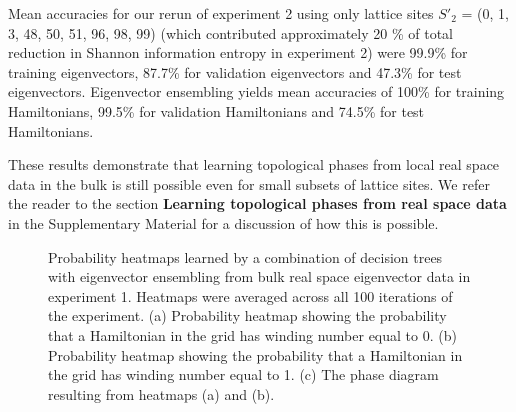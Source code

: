 \documentclass[10pt]{revtex4-1}
\begin{document}
Mean accuracies for our rerun of experiment 2 using only lattice sites $S'_2$ = (0, 1, 3, 48, 50, 51, 96, 98, 99) (which contributed approximately 20 \% of total reduction in Shannon information entropy in experiment 2) were 99.9\% for training eigenvectors, 87.7\% for validation eigenvectors and 47.3\% for test eigenvectors. Eigenvector ensembling yields mean accuracies of 100\% for training Hamiltonians, 99.5\% for validation Hamiltonians and 74.5\% for test Hamiltonians.  

These results demonstrate that learning topological phases from local real space data in the bulk is still possible even for small subsets of lattice sites. We refer the reader to the section \textbf{Learning topological phases from real space data} in the Supplementary Material for a discussion of how this is possible.

\begin{figure}
\centering
{}
\caption{Probability heatmaps learned by a combination of decision trees with eigenvector ensembling from bulk real space eigenvector data in experiment 1. Heatmaps were averaged across all 100 iterations of the experiment. (a) Probability heatmap showing the probability that a Hamiltonian in the grid has winding number equal to 0.  (b) Probability heatmap showing the probability that a Hamiltonian in the grid has winding number equal to 1. (c) The phase diagram resulting from heatmaps (a) and (b).}
\label{ssh1_heatmaps}
\end{figure}
\end{document}
